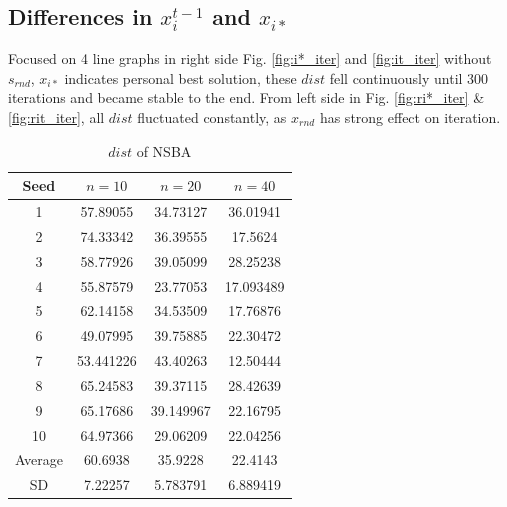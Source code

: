 \subsection{Differences in ${x_i^{t-1}}$ and ${x_{i*}}$}
Focused on 4 line graphs in right side Fig. \ref{fig:i*_iter} and \ref{fig:it_iter} without ${s_{rnd}}$, ${x_{i*}}$ indicates personal best solution, these ${dist}$ fell continuously until 300 iterations and became stable to the end. From left side in Fig. \ref{fig:ri*_iter} \& \ref{fig:rit_iter}, all ${dist}$ fluctuated constantly, as ${x_{rnd}}$ has strong effect on iteration.


\begin{table}[h]
\begin{center}
\caption{$dist$ of NSBA}
\label{tb:nsba}
\begin{tabular}{cccc}
\hline 
Seed & $n=10$ & $n=20$ & $n=40$ 
\\
\hline \hline
1 & 57.89055 & 34.73127 & 36.01941 \\
2 & 74.33342 & 36.39555 & 17.5624 \\
3 & 58.77926 & 39.05099 & 28.25238 \\
4 & 55.87579 & 23.77053 & 17.093489 \\
5 & 62.14158 & 34.53509 & 17.76876 \\
6 & 49.07995 & 39.75885 & 22.30472 \\
7 & 53.441226 & 43.40263 & 12.50444 \\
8 & 65.24583 & 39.37115 & 28.42639 \\
9 & 65.17686 & 39.149967 & 22.16795 \\
10 & 64.97366 & 29.06209 & 22.04256 \\
\hline
Average & 60.6938 & 35.9228 & 22.4143 \\
SD & 7.22257 & 5.783791 & 6.889419 \\
\hline
\end{tabular}
\end{center}
\end{table}


